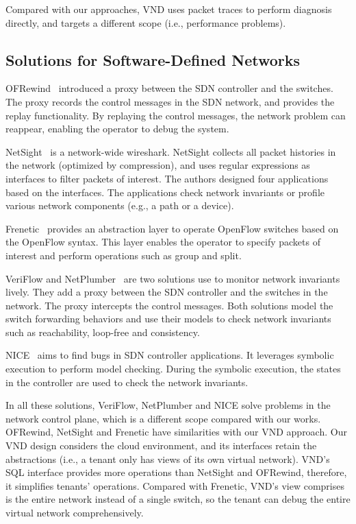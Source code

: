 Compared with our approaches, VND uses packet traces to perform diagnosis directly,
and \Name targets a different scope (i.e., performance problems).
\subsection{Solutions for Software-Defined Networks}
OFRewind~\cite{ofrewind} introduced a proxy between the SDN controller and 
the switches. The proxy records the control messages in the SDN network, and 
provides the replay functionality. By replaying the control messages, the network
problem can reappear, enabling the operator to debug the system.

NetSight~\cite{netsight} is a network-wide wireshark. NetSight collects all packet histories
in the network (optimized by compression), and uses regular expressions as interfaces to filter
packets of interest. The authors designed four applications based on the interfaces. 
The applications check network invariants or profile various network components (e.g., a path or a device).

Frenetic~\cite{frenetic} provides an abstraction layer to operate OpenFlow switches based on the 
OpenFlow syntax. This layer enables the operator to specify packets of 
interest and perform operations such as group and split. 

VeriFlow and NetPlumber~\cite{veriflow, netplumber} are two solutions use to monitor network invariants lively. 
They add a proxy between the SDN controller and the switches in the network. The proxy
intercepts the control messages. Both solutions model the switch forwarding behaviors
and use their models to check network invariants such as reachability, loop-free and
consistency.

NICE~\cite{nice} aims to find bugs in SDN controller applications. It leverages symbolic execution
to perform model checking. During the symbolic execution, the states in the controller
are used to check the network invariants. 

In all these solutions, VeriFlow, NetPlumber and NICE solve problems in the network 
control plane, which is a different scope compared with our works. OFRewind, NetSight and
Frenetic have similarities with our VND approach. Our VND design considers the cloud environment,
and its interfaces retain the abstractions (i.e., a tenant only has views
of its own virtual network). VND's SQL interface provides more operations than NetSight and 
OFRewind, therefore, it simplifies tenants' operations. Compared with Frenetic, VND's view 
comprises is the
entire network instead of a single switch, so the tenant can debug the entire virtual network
comprehensively.

